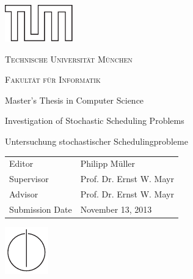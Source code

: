 
\thispagestyle{empty}
\begin{center}
  
  \vspace{4cm}
  
  \includegraphics[scale=2]{formalities/tum_logo_outline}

  \vspace{1cm}

  \LARGE

  \textsc{Technische Universität München}

  \Large

  \textsc{Fakultät für Informatik}

  \vspace{2cm}

  \normalsize
  
  Master's Thesis in Computer Science

  \vspace{2cm}

  \Huge

  Investigation of Stochastic Scheduling Problems

  \vspace{1cm}

  Untersuchung stochastischer Schedulingprobleme

  \vfill

  \normalsize

  \begin{tabular}[h!]{ll}
    Editor & Philipp Müller \\
    Supervisor & Prof. Dr. Ernst W. Mayr \\
    Advisor & Prof. Dr. Ernst W. Mayr \\
    Submission Date & November 13, 2013
  \end{tabular}

  \vspace{0.5cm}

  \includegraphics[scale=1.5]{formalities/tum_info_logo}

\end{center}

\newpage

